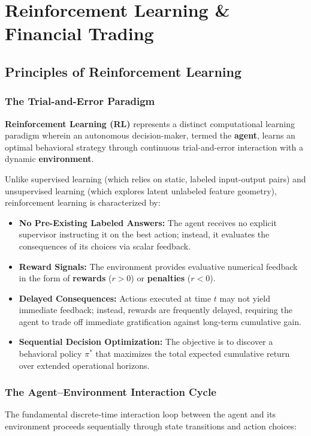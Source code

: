 \chapter{Reinforcement Learning \& Financial Trading}
\label{ch:reinforcement_learning}

\section{Principles of Reinforcement Learning}

\subsection{The Trial-and-Error Paradigm}
\textbf{Reinforcement Learning (RL)} represents a distinct computational learning paradigm wherein an autonomous decision-maker, termed the \textbf{agent}, learns an optimal behavioral strategy through continuous trial-and-error interaction with a dynamic \textbf{environment}.

Unlike supervised learning (which relies on static, labeled input-output pairs) and unsupervised learning (which explores latent unlabeled feature geometry), reinforcement learning is characterized by:
\begin{itemize}
    \item \textbf{No Pre-Existing Labeled Answers:} The agent receives no explicit supervisor instructing it on the best action; instead, it evaluates the consequences of its choices via scalar feedback.
    \item \textbf{Reward Signals:} The environment provides evaluative numerical feedback in the form of \textbf{rewards} ($r > 0$) or \textbf{penalties} ($r < 0$).
    \item \textbf{Delayed Consequences:} Actions executed at time $t$ may not yield immediate feedback; instead, rewards are frequently delayed, requiring the agent to trade off immediate gratification against long-term cumulative gain.
    \item \textbf{Sequential Decision Optimization:} The objective is to discover a behavioral policy $\pi^*$ that maximizes the total expected cumulative return over extended operational horizons.
\end{itemize}

\subsection{The Agent--Environment Interaction Cycle}
The fundamental discrete-time interaction loop between the agent and its environment proceeds sequentially through state transitions and action choices:

